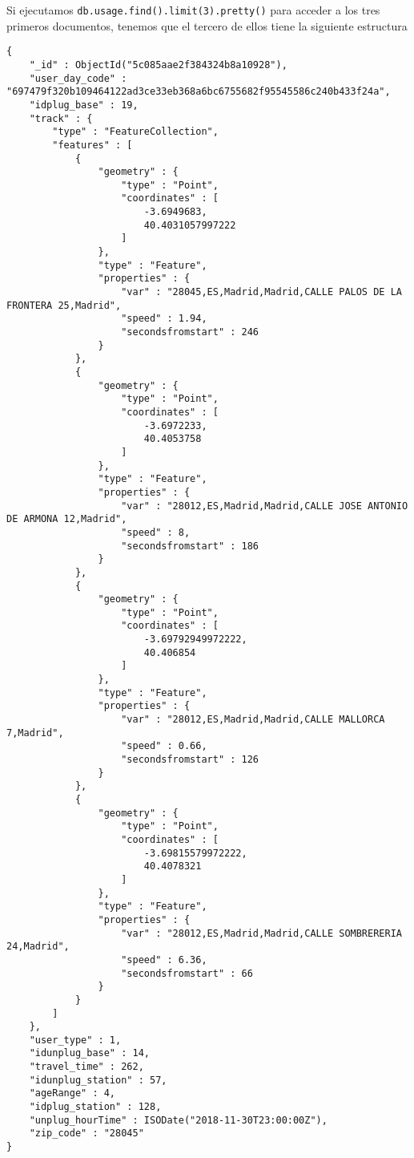 \documentclass[]{article}
\begin{document}
Si ejecutamos \texttt{db.usage.find().limit(3).pretty()} para acceder a
los tres primeros documentos, tenemos que el tercero de ellos tiene la
siguiente estructura

\begin{verbatim}
{
    "_id" : ObjectId("5c085aae2f384324b8a10928"),
    "user_day_code" : "697479f320b109464122ad3ce33eb368a6bc6755682f95545586c240b433f24a",
    "idplug_base" : 19,
    "track" : {
        "type" : "FeatureCollection",
        "features" : [
            {
                "geometry" : {
                    "type" : "Point",
                    "coordinates" : [
                        -3.6949683,
                        40.4031057997222
                    ]
                },
                "type" : "Feature",
                "properties" : {
                    "var" : "28045,ES,Madrid,Madrid,CALLE PALOS DE LA FRONTERA 25,Madrid",
                    "speed" : 1.94,
                    "secondsfromstart" : 246
                }
            },
            {
                "geometry" : {
                    "type" : "Point",
                    "coordinates" : [
                        -3.6972233,
                        40.4053758
                    ]
                },
                "type" : "Feature",
                "properties" : {
                    "var" : "28012,ES,Madrid,Madrid,CALLE JOSE ANTONIO DE ARMONA 12,Madrid",
                    "speed" : 8,
                    "secondsfromstart" : 186
                }
            },
            {
                "geometry" : {
                    "type" : "Point",
                    "coordinates" : [
                        -3.69792949972222,
                        40.406854
                    ]
                },
                "type" : "Feature",
                "properties" : {
                    "var" : "28012,ES,Madrid,Madrid,CALLE MALLORCA 7,Madrid",
                    "speed" : 0.66,
                    "secondsfromstart" : 126
                }
            },
            {
                "geometry" : {
                    "type" : "Point",
                    "coordinates" : [
                        -3.69815579972222,
                        40.4078321
                    ]
                },
                "type" : "Feature",
                "properties" : {
                    "var" : "28012,ES,Madrid,Madrid,CALLE SOMBRERERIA 24,Madrid",
                    "speed" : 6.36,
                    "secondsfromstart" : 66
                }
            }
        ]
    },
    "user_type" : 1,
    "idunplug_base" : 14,
    "travel_time" : 262,
    "idunplug_station" : 57,
    "ageRange" : 4,
    "idplug_station" : 128,
    "unplug_hourTime" : ISODate("2018-11-30T23:00:00Z"),
    "zip_code" : "28045"
}
\end{verbatim}
\end{document}
